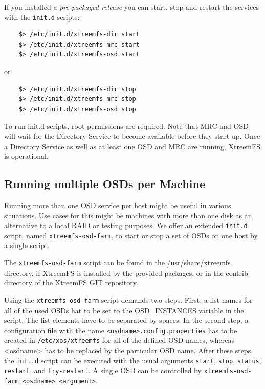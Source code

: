 \documentclass[a4paper,10pt]{book}
\begin{document}
If you installed a \emph{pre-packaged release} you can start, stop and restart the services with the \texttt{init.d} scripts:
	\begin{verbatim}
	$> /etc/init.d/xtreemfs-dir start
	$> /etc/init.d/xtreemfs-mrc start
	$> /etc/init.d/xtreemfs-osd start
	\end{verbatim}
or
	\begin{verbatim}
	$> /etc/init.d/xtreemfs-dir stop
	$> /etc/init.d/xtreemfs-mrc stop
	$> /etc/init.d/xtreemfs-osd stop
	\end{verbatim}


To run init.d scripts, root permissions are required. Note that MRC and OSD will wait for the Directory Service to become available before they start up. Once a Directory Service as well as at least one OSD and MRC are running, XtreemFS is operational.

% 
% 

\subsection{Running multiple OSDs per Machine}
\label{sec:xtreemfs-osd-farm}

Running more than one OSD service per host might be useful in various situations. Use cases for this might be machines with more than one disk as an alternative to a local RAID or testing purposes. We offer an extended \texttt{init.d} script, named \texttt{xtreemfs-osd-farm}, to start or stop a set of OSDs on one host by a single script.

The \texttt{xtreemfs-osd-farm} script can be found in the /usr/share/xtreemfs directory, if XtreemFS is installed by the provided packages, or in the contrib directory of the XtreemFS GIT repository. 

Using the \texttt{xtreemfs-osd-farm} script demands two steps. First, a list names for all of the used OSDs hat to be set to the OSD\_INSTANCES variable in the script. The list elements have to be separated by spaces. In the second step, a configuration file with the name \texttt{<osdname>.config.properties} has to be created in \texttt{/etc/xos/xtreemfs} for all of the defined OSD names, whereas <osdname> has to be replaced by the particular OSD name. After these steps, the \texttt{init.d} script can be executed with the usual arguments \texttt{start}, \texttt{stop}, \texttt{status}, \texttt{restart}, and \texttt{try-restart}. A single OSD can be controlled by \texttt{xtreemfs-osd-farm <osdname> <argument>}.
\end{document}
